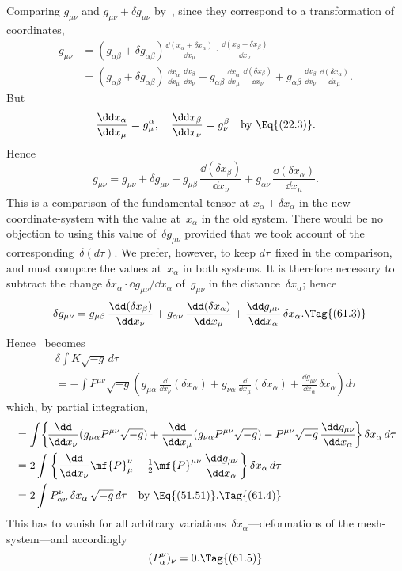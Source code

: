\documentclass[12pt]{book}
\begin{document}
Comparing $g_{\mu\nu}$ and $g_{\mu\nu} + \delta g_{\mu\nu}$ by~, since they correspond to a transformation
of coordinates,
\begin{align*}
  g_{\mu\nu} &= (g_{\alpha\beta} + \delta g_{\alpha\beta})
        \frac{\dd(x_{\alpha} + \delta x_{\alpha})}{\dd x_{\mu}}
  \cdot \frac{\dd(x_{\beta} + \delta x_{\beta})}{\dd x_{\nu}} \\
  &= (g_{\alpha\beta} + \delta g_{\alpha\beta})\,
  \frac{\dd x_{\alpha}}{\dd x_{\mu}}\, \frac{\dd x_{\beta}}{\dd x_{\nu}}
  + g_{\alpha\beta}\,
  \frac{\dd x_{\alpha}}{\dd x_{\mu}}\, \frac{\dd (\delta x_{\beta})}{\dd x_{\nu}}
  + g_{\alpha\beta}\,
  \frac{\dd x_{\beta}}{\dd x_{\nu}}\, \frac{\dd (\delta x_{\alpha})}{\dd x_{\mu}}.
\end{align*}
But
\[
\frac{\dd x_{\alpha}}{\dd x_{\mu}} = g_{\mu}^{\alpha},\quad
\frac{\dd x_{\beta}}{\dd x_{\nu}} = g_{\nu}^{\beta}\quad\text{by~\Eq{(22.3)}.}
\]
Hence
\[
g_{\mu\nu} = g_{\mu\nu} + \delta g_{\mu\nu}
+ g_{\mu\beta}\, \frac{\dd(\delta x_{\beta})}{\dd x_{\nu}}
+ g_{\alpha\nu}\, \frac{\dd(\delta x_{\alpha})}{\dd x_{\mu}}.
\]
This is a comparison of the fundamental tensor at $x_{\alpha} + \delta x_{\alpha}$ in the new
coordinate-system with the value at~$x_{\alpha}$ in the old system. There would be no
objection to using this value of~$\delta g_{\mu\nu}$ provided that we took account of the
corresponding~$\delta(d\tau)$. We prefer, however, to keep $d\tau$~fixed in the comparison,
and must compare the values at~$x_{\alpha}$ in both systems. It is therefore necessary
to subtract the change $\delta x_{\alpha} \cdot \dd g_{\mu\nu}/\dd x_{\alpha}$ of~$g_{\mu\nu}$ in the distance~$\delta x_{\alpha}$; hence
\[
-\delta g_{\mu\nu}
= g_{\mu\beta}\, \frac{\dd(\delta x_{\beta})}{\dd x_{\nu}}
+ g_{\alpha\nu}\, \frac{\dd(\delta x_{\alpha})}{\dd x_{\mu}}
+ \frac{\dd g_{\mu\nu}}{\dd x_{\alpha}}\, \delta x_{\alpha}.
\Tag{(61.3)}
\]
Hence ~becomes
\begin{multline*}
\delta \int K \sqrt{-g}\, d\tau \\
= -\int P^{\mu\nu} \sqrt{-g} \left(
g_{\mu\alpha}\, \frac{\dd}{\dd x_{\nu}} (\delta x_{\alpha})
+ g_{\nu\alpha}\, \frac{\dd}{\dd x_{\mu}} (\delta x_{\alpha})
+ \frac{\dd g_{\mu\nu}}{\dd x_{\alpha}}\, \delta x_{\alpha}
\right) d\tau
\end{multline*}
which, by partial integration,
\begin{align*}
  &= \int\! \left\{\!\frac{\dd}{\dd x_{\nu}} (g_{\mu\alpha} P^{\mu\nu} \sqrt{-g})
  + \frac{\dd}{\dd x_{\mu}} (g_{\nu\alpha} P^{\mu\nu} \sqrt{-g})
  - P^{\mu\nu} \sqrt{-g}\, \frac{\dd g_{\mu\nu}}{\dd x_{\alpha}}\!\right\} \delta x_{\alpha}\, d\tau \\
  &= 2\int \left\{\frac{\dd}{\dd x_{\nu}} \mf{P}_{\mu}^{\nu}
  - \tfrac{1}{2} \mf{P}^{\mu\nu}\, \frac{\dd g_{\mu\nu}}{\dd x_{\alpha}}\right\} \delta x_{\alpha}\, d\tau \\
  &= 2\int P_{\alpha\nu}^{\nu}\, \delta x_{\alpha}\, \sqrt{-g}\, d\tau
  \quad\text{by~\Eq{(51.51)}.}
  \Tag{(61.4)}
\end{align*}
This has to vanish for all arbitrary variations~$\delta x_{\alpha}$---deformations of the mesh-system---and
accordingly
\[
(P_{\alpha}^{\nu})_{\nu} = 0.
\Tag{(61.5)}
\]
\end{document}
